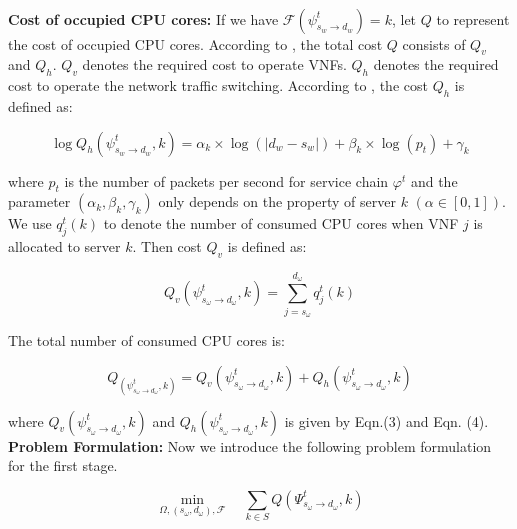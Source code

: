 \documentclass{acmtog}
\begin{document}
\\\noindent\textbf{Cost of occupied CPU cores: } If we have $\mathcal{F}(\psi^t_{s_w \to d_w})=k$, let $Q$ to represent the cost of occupied CPU cores. According to \cite{c1}, the total cost $Q$ consists of $Q_v$ and $Q_h$. $Q_v$ denotes the required cost to operate VNFs. $Q_h$ denotes the required cost to operate the network traffic switching. According to \cite{c2}, the cost $Q_h$ is defined as:
\vspace{-2ex}
\begin{center}
    \begin{equation}
        \log Q_h(\psi^t_{s_w \to d_w},k)=\alpha_k\times 
        \log(\left| d_w - s_w\right|)+ \beta_k\times 
        \log(p_t)+\gamma_k
    \end{equation}
\end{center}
where $p_t$ is the number of packets per second for service chain $\varphi^t$ and the parameter $(\alpha_k,\beta_k,\gamma_k)$ only depends on the property of server $k$ $(\alpha\in [0,1])$.
\\\indent We use $q^t_j(k)$ to denote the number of consumed CPU cores when VNF $j$ is allocated to server $k$. Then cost $Q_v$ is defined as:
\vspace{-2ex}
\begin{center}
    \begin{equation}
        Q_v(\psi_{s_\omega\to  d_\omega}^t,k) = \sum_{j=s_\omega}^{d_\omega}q_j^t(k)
    \end{equation}
\end{center}
The total number of consumed CPU cores is:
\begin{center}
    \begin{equation}
         Q_(\psi_{s_\omega\to  d_\omega}^t,k) = Q_v(\psi_{s_\omega\to  d_\omega}^t,k)+ Q_h(\psi_{s_\omega\to  d_\omega}^t,k)
    \end{equation}
\end{center}
where $Q_v(\psi_{s_\omega\to  d_\omega}^t,k)$ and $ Q_h(\psi_{s_\omega\to  d_\omega}^t,k)$ is given by Eqn.(3) and Eqn. (4).
\\\textbf{Problem Formulation: }Now we introduce the following problem formulation for the first stage.
\begin{center}
\begin{equation}
\min_{\Omega,(s_\omega,d_\omega),\mathcal{F}}\quad  \sum_{k\in S}   Q(\Psi_{s_\omega\rightarrow d_\omega}^t,k)
\end{equation}
\end{center}
\end{document}
